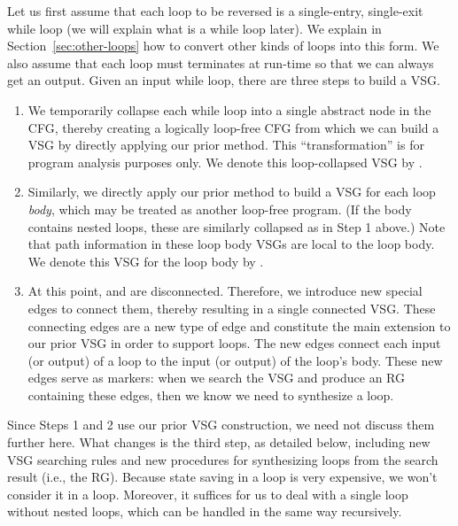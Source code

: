 Let us first assume that each loop to be reversed is a single-entry, single-exit while loop (we will explain what is a while loop later).
We explain in Section~\ref{sec:other-loops} how to convert other kinds of loops into this form.
We also assume that each loop must terminates at run-time so that we can always get an output.
Given an input while loop, there are three steps to build a VSG.
%
\begin{enumerate}

\item We temporarily collapse each while loop into a single abstract node in the CFG, thereby creating a logically loop-free CFG from which we can build a VSG by directly applying our prior method.
This ``transformation'' is for program analysis purposes only. 
We denote this loop-collapsed VSG by \pVSG.

\item Similarly, we directly apply our prior method to build a VSG for each loop \emph{body}, which may be treated as another loop-free program.
(If the body contains nested loops, these are similarly collapsed as in Step 1 above.)
Note that path information in these loop body VSGs are local to the loop body.
We denote this VSG for the loop body by \lVSG.

\item At this point, \pVSG and \lVSG are disconnected.
Therefore, we introduce new special edges to connect them, thereby resulting in a single connected VSG.
These connecting edges are a new type of edge and constitute the main extension to our prior VSG in order to support loops.
The new edges connect each input (or output) of a loop to the input (or output) of the loop's body.
These new edges serve as markers: when we search the VSG and produce an RG containing these edges, then we know we need to synthesize a loop.

\end{enumerate}
%
Since Steps 1 and 2 use our prior VSG construction, we need not discuss them further here.
What changes is the third step, as detailed below, including new VSG searching rules and new procedures for synthesizing loops from the search result (i.e., the RG). %
Because state saving in a loop is very expensive, we won't consider it in a loop. Moreover, it suffices for us to deal with a single loop without nested loops, which can be handled in the same way recursively.

